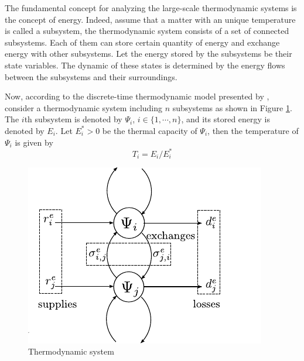 \documentclass[preprint,authoryear,12pt]{elsarticle}
\begin{document}
The fundamental concept for analyzing the large-scale thermodynamic
systems is the concept of energy. Indeed, assume that a matter with
an unique temperature is called a subsystem, the thermodynamic system
consists of a set of connected subsystems. Each of them can store
certain quantity of energy and exchange energy with other subsystems.
Let the energy stored by the subsystems be their state variables. The
dynamic of these states is determined by the energy flows between the
subsystems and their surroundings.

Now, according to the discrete-time thermodynamic model presented by
\citet{haddad_thermodynamic_2005}, consider a thermodynamic system
including $n$ subsystems as shown in Figure \ref{fig:Ther_Sys}. The
$i$th subsystem is denoted by $\Psi_i$, $i\in \{1,\cdots,n\}$, and
its stored energy is denoted by $E_i$. Let $E_i^*>0$ be the thermal
capacity of $\Psi_i$, then the temperature of $\Psi_i$ is given by
\begin{equation}\label{equ:temperature}
    T_i= {E_i}/{E^*_i}
\end{equation}

\begin{figure}[ht]
  \centering
  \includegraphics{pics/HModel}
  \caption{Thermodynamic system}
  \label{fig:Ther_Sys}
\end{figure}
\end{document}
